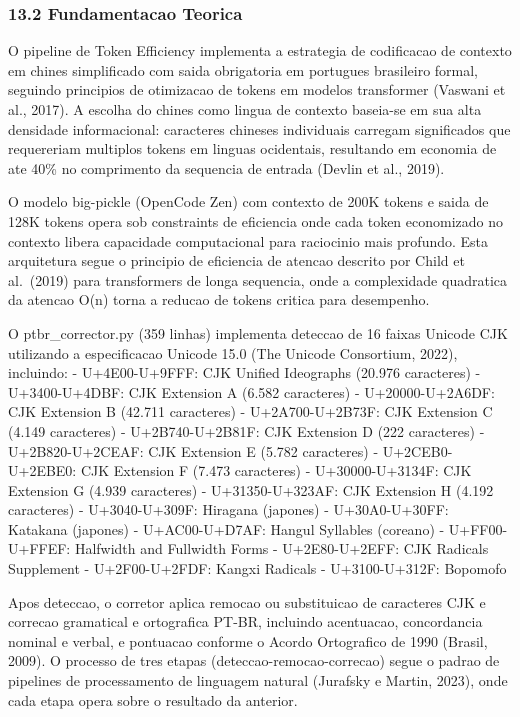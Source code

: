 \documentclass[
  12pt,
]{article}
\begin{document}
\subsubsection{13.2 Fundamentacao
Teorica}\label{fundamentacao-teorica-12}

O pipeline de Token Efficiency implementa a estrategia de codificacao de
contexto em chines simplificado com saida obrigatoria em portugues
brasileiro formal, seguindo principios de otimizacao de tokens em
modelos transformer (Vaswani et al., 2017). A escolha do chines como
lingua de contexto baseia-se em sua alta densidade informacional:
caracteres chineses individuais carregam significados que requereriam
multiplos tokens em linguas ocidentais, resultando em economia de ate
40\% no comprimento da sequencia de entrada (Devlin et al., 2019).

O modelo big-pickle (OpenCode Zen) com contexto de 200K tokens e saida
de 128K tokens opera sob constraints de eficiencia onde cada token
economizado no contexto libera capacidade computacional para raciocinio
mais profundo. Esta arquitetura segue o principio de eficiencia de
atencao descrito por Child et al.~(2019) para transformers de longa
sequencia, onde a complexidade quadratica da atencao O(n) torna a
reducao de tokens critica para desempenho.

O ptbr\_corrector.py (359 linhas) implementa deteccao de 16 faixas
Unicode CJK utilizando a especificacao Unicode 15.0 (The Unicode
Consortium, 2022), incluindo: - U+4E00-U+9FFF: CJK Unified Ideographs
(20.976 caracteres) - U+3400-U+4DBF: CJK Extension A (6.582 caracteres)
- U+20000-U+2A6DF: CJK Extension B (42.711 caracteres) -
U+2A700-U+2B73F: CJK Extension C (4.149 caracteres) - U+2B740-U+2B81F:
CJK Extension D (222 caracteres) - U+2B820-U+2CEAF: CJK Extension E
(5.782 caracteres) - U+2CEB0-U+2EBE0: CJK Extension F (7.473 caracteres)
- U+30000-U+3134F: CJK Extension G (4.939 caracteres) - U+31350-U+323AF:
CJK Extension H (4.192 caracteres) - U+3040-U+309F: Hiragana (japones) -
U+30A0-U+30FF: Katakana (japones) - U+AC00-U+D7AF: Hangul Syllables
(coreano) - U+FF00-U+FFEF: Halfwidth and Fullwidth Forms -
U+2E80-U+2EFF: CJK Radicals Supplement - U+2F00-U+2FDF: Kangxi Radicals
- U+3100-U+312F: Bopomofo

Apos deteccao, o corretor aplica remocao ou substituicao de caracteres
CJK e correcao gramatical e ortografica PT-BR, incluindo acentuacao,
concordancia nominal e verbal, e pontuacao conforme o Acordo Ortografico
de 1990 (Brasil, 2009). O processo de tres etapas
(deteccao-remocao-correcao) segue o padrao de pipelines de processamento
de linguagem natural (Jurafsky e Martin, 2023), onde cada etapa opera
sobre o resultado da anterior.
\end{document}
